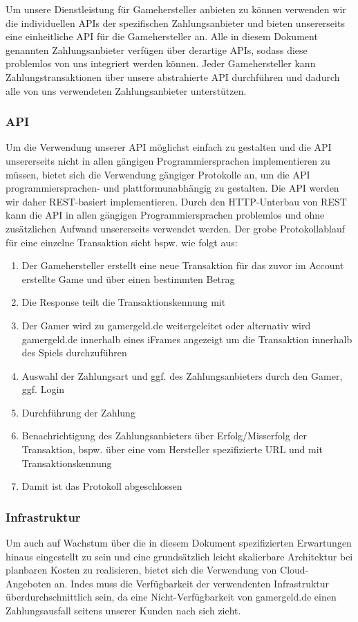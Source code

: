 
Um unsere Dienstleistung für Gamehersteller anbieten zu können verwenden wir
die individuellen APIs der spezifischen Zahlungsanbieter und bieten
unsererseits eine einheitliche API für die Gamehersteller an. Alle in diesem
Dokument genannten Zahlungsanbieter verfügen über derartige APIs, sodass diese
problemlos von uns integriert werden können. Jeder Gamehersteller kann
Zahlungstransaktionen über unsere abstrahierte API durchführen und dadurch alle
von uns verwendeten Zahlungsanbieter unterstützen. 

\subsubsection{API}
Um die Verwendung unserer API möglichst einfach zu gestalten und die API
unsererseits nicht in allen gängigen Programmiersprachen implementieren zu
müssen, bietet sich die Verwendung gängiger Protokolle an, um die API
programmiersprachen- und plattformunabhängig zu gestalten. Die API werden wir
daher REST-basiert implementieren. Durch den HTTP-Unterbau von REST kann die
API in allen gängigen Programmiersprachen problemlos und ohne zusätzlichen
Aufwand unsererseits verwendet werden. Der grobe Protokollablauf für eine
einzelne Transaktion sieht bspw. wie folgt aus:

\begin{enumerate}
  \item Der Gamehersteller erstellt eine neue Transaktion für das zuvor im Account
    erstellte Game und über einen bestimmten Betrag
  \item Die Response teilt die Transaktionskennung mit
  \item Der Gamer wird zu gamergeld.de weitergeleitet oder alternativ wird gamergeld.de
    innerhalb eines iFrames angezeigt um die Transaktion innerhalb des Spiels durchzuführen
  \item Auswahl der Zahlungsart und ggf. des Zahlungsanbieters durch den Gamer, ggf. Login
  \item Durchführung der Zahlung
  \item Benachrichtigung des Zahlungsanbieters über Erfolg/Misserfolg der Transaktion,
    bspw. über eine vom Hersteller spezifizierte URL und mit Transaktionskennung
  \item Damit ist das Protokoll abgeschlossen
\end{enumerate}

\subsubsection{Infrastruktur}
Um auch auf Wachstum über die in diesem Dokument spezifizierten Erwartungen
hinaus eingestellt zu sein und eine grundsätzlich leicht skalierbare
Architektur bei planbaren Kosten zu realisieren, bietet sich die Verwendung von
Cloud-Angeboten an. Indes muss die Verfügbarkeit der verwendenten Infrastruktur
überdurchschnittlich sein, da eine Nicht-Verfügbarkeit von gamergeld.de einen
Zahlungsausfall seitens unserer Kunden nach sich zieht.

